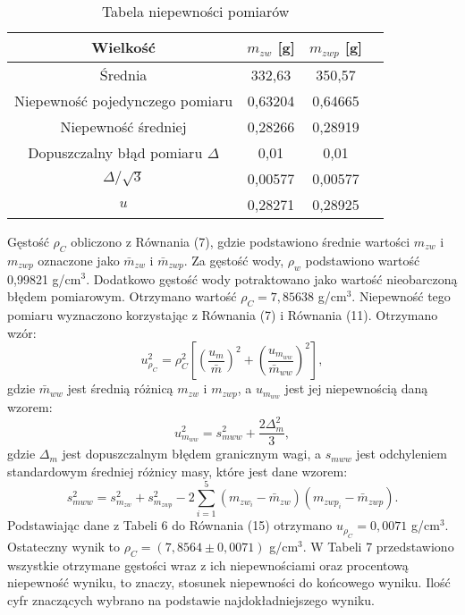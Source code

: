 \documentclass[10pt,a4paper]{article}
\begin{document}
  \begin{center}
 \begin{table}[h!]
 \label{6}
 \centering
 \caption{Tabela niepewności pomiarów }
 \begin{tabular}{|c|c|c|c|}
 \hline
 Wielkość &$m_{zw}$ [g] & $m_{zwp}$ [g]  \\
 \hline
Średnia & 332,63 &350,57 \\
\hline
Niepewność pojedynczego pomiaru&0,63204&0,64665\\
\hline
Niepewność średniej&0,28266&0,28919\\
\hline
Dopuszczalny błąd pomiaru $\Delta$& 0,01&0,01\\
\hline
$\Delta / \sqrt{3}$&0,00577&0,00577\\
\hline
$u$&0,28271&0,28925\\
\hline
 \end{tabular}
 \end{table}
 \end{center}
 Gęstość $\rho_{C}$ obliczono z Równania (7), gdzie podstawiono średnie wartości $m_{zw}$ i $m_{zwp}$ oznaczone jako $\bar{m}_{zw}$ i $\bar{m}_{zwp}$. Za gęstość wody, $\rho_{w}$ podstawiono wartość 0,99821 g/cm$^3$. Dodatkowo gęstość wody potraktowano jako wartość nieobarczoną błędem pomiarowym. Otrzymano wartość $\rho_{C}=7,85638$ g/cm$^3$. Niepewność tego pomiaru wyznaczono korzystając z Równania (7) i Równania (11). Otrzymano wzór:
 \begin{equation}
 u_{\rho_{C}}^2=\rho_{C}^2 \left[ \left(\dfrac{u_{m}}{\bar{m}}\right)^2+\left(\dfrac{u_{m_{ww}}}{\bar{m}_{ww}}\right)^2 \right ],
 \end{equation}
 gdzie $\bar{m}_{ww}$ jest średnią różnicą $m_{zw}$ i $m_{zwp}$, a $u_{m_{ww}}$ jest jej niepewnością daną wzorem:
 \begin{equation}
  u_{m_{ww}}^2=s_{mww}^2+\dfrac{2\Delta_{m}^2}{3},
  \end{equation} 
  gdzie $\Delta_{m}$ jest dopuszczalnym błędem granicznym wagi, a $s_{mww}$ jest odchyleniem standardowym średniej różnicy masy, które jest dane wzorem:
  \begin{equation}
 s_{mww}^2=s_{m_{zw}}^2+s_{m_{zwp}}^2-2 \sum_{i=1}^{5} (m_{zw_{i}}- \bar{m}_{zw})(m_{zwp_{i}}- \bar{m}_{zwp}).
 \end{equation}
  Podstawiając dane z Tabeli 6 do Równania (15) otrzymano $u_{\rho_{C}}=0,0071$ g/cm$^3$. Ostateczny wynik to $\rho_{C}=(7,8564\pm 0,0071)$ g/cm$^3$. W Tabeli 7 przedstawiono wszystkie otrzymane gęstości wraz z ich niepewnościami oraz procentową niepewność wyniku, to znaczy, stosunek niepewności do końcowego wyniku. Ilość cyfr znaczących wybrano na podstawie najdokładniejszego wyniku.
  
\end{document}

